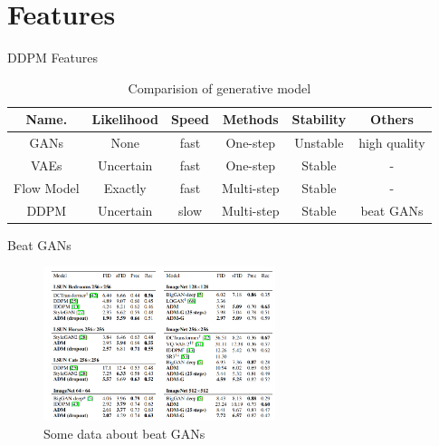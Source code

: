 \documentclass[aspectratio=169]{beamer}
\begin{document}
\section{Features}

\begin{frame}{DDPM Features}
    \begin{table}
        \begin{tabular}{| c || c | c | c | c | c |  }
            \hline
            Name.      & Likelihood & Speed & Methods    & Stability & Others       \\
            \hline \hline
            GANs       & None       & fast  & One-step   & Unstable  & high quality \\
            VAEs       & Uncertain  & fast  & One-step   & Stable    & -            \\
            Flow Model & Exactly    & fast  & Multi-step & Stable    & -            \\
            DDPM       & Uncertain  & slow  & Multi-step & Stable    & beat GANs    \\
            \hline
        \end{tabular}
        \caption{Comparision of generative model}
    \end{table}
\end{frame}

\begin{frame}{Beat GANs}
    \centering
    \begin{figure}
        \includegraphics[height=4.5cm]{../pic/beat-GANs.png}
        \caption{Some data about beat GANs}
    \end{figure}
\end{frame}
\end{document}
